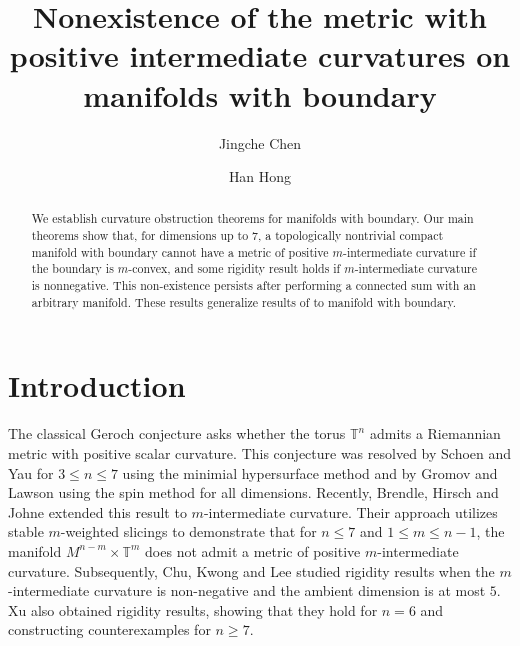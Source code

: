 \documentclass[11pt,letterpaper]{amsart}
\theoremstyle{definition}
\theoremstyle{remark}
\numberwithin{equation}{section}
\begin{document}
\title[Nonexistence of the metric with positive $Cm$ and $H_m$]{Nonexistence of the metric with positive intermediate curvatures on manifolds with boundary}

\author{Jingche Chen}
\address{Department of Mathematical Sciences, Tsinghua University, 100084, Beijing, China}



\author{Han Hong}
\address{Department of Mathematics and statistics \\ Beijing Jiaotong University \\ Beijing \\ China, 100044}







\begin{abstract}
We establish curvature obstruction theorems for manifolds with boundary. Our main theorems show that, for dimensions up to 7, a topologically nontrivial compact manifold with boundary cannot have a metric of positive 
$m$-intermediate curvature if the boundary is $m$-convex, and some rigidity result holds if $m$-intermediate curvature is nonnegative. This non-existence persists after performing a connected sum with an arbitrary manifold. These results generalize results of \cite{brendlegeroch'sconjecture,chenshuli_end,ChuKwongLeerigidity,XuTrans} to manifold with boundary.
\end{abstract}

\maketitle

\section{Introduction}

The classical Geroch conjecture asks whether the torus $\mathbb{T}^{n}$ admits a Riemannian metric with positive scalar curvature. This conjecture was resolved by Schoen and Yau \cite{Schoen-Yau-PSC} for $3\leq n\leq 7$ using the minimial hypersurface method and by Gromov and Lawson \cite{Gromov-Lawson-psc} using the spin method for all dimensions. Recently, Brendle, Hirsch and Johne \cite{brendlegeroch'sconjecture} extended this result to $m$-intermediate curvature. Their approach utilizes stable $m$-weighted slicings to demonstrate that for $n\leq 7$ and $1\leq m\leq n-1$, the manifold $M^{n-m}\times \mathbb{T}^{m}$ does not admit a metric of positive $m$-intermediate curvature. Subsequently, Chu, Kwong and Lee \cite{ChuKwongLeerigidity} studied rigidity results when the $m$-intermediate curvature
is non-negative and the ambient dimension is at most $5$. Xu \cite{XuTrans} also obtained rigidity results, showing that they  hold for $n=6$ and constructing  counterexamples for $n\geq 7$. 
\end{document}

